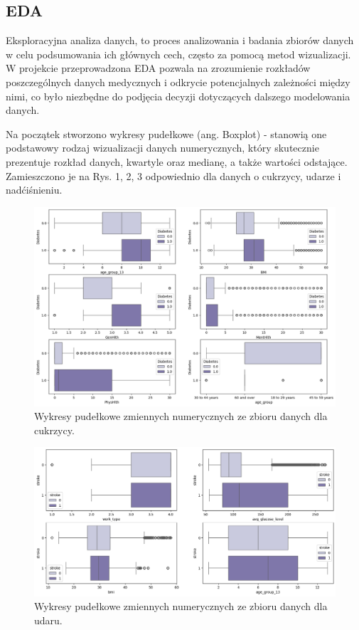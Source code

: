 \documentclass[onecolumn,12pt]{article}
\begin{document}
\subsection{EDA}
\noindent
Eksploracyjna analiza danych, to proces analizowania i badania zbiorów danych w celu podsumowania ich głównych cech, często za pomocą metod wizualizacji. W projekcie przeprowadzona EDA pozwala na zrozumienie rozkładów poszczególnych danych medycznych i odkrycie potencjalnych zależności między nimi, co było niezbędne do podjęcia decyzji dotyczących dalszego modelowania danych.

\vspace{8pt}
\noindent
Na początek stworzono wykresy pudełkowe (ang. Boxplot) - stanowią one podstawowy rodzaj wizualizacji danych numerycznych, który skutecznie prezentuje rozkład danych, kwartyle oraz medianę, a także wartości odstające. Zamieszczono je na Rys. 1, 2, 3 odpowiednio dla danych o cukrzycy, udarze i nadćiśnieniu. 

\begin{figure}[H]
    \centering
    \includegraphics[width=1\linewidth]{raport/graphs/diabetes_boxplots.png}
    \captionsetup{justification=centering}
    \caption{Wykresy pudełkowe zmiennych numerycznych ze zbioru danych dla cukrzycy.}
    \label{fig:enter-label}
\end{figure}

\begin{figure}[H]
    \centering
    \includegraphics[width=1\linewidth]{raport/graphs/stroke_boxplots.png}
    \captionsetup{justification=centering}
    \caption{Wykresy pudełkowe zmiennych numerycznych ze zbioru danych dla udaru.}
    \label{fig:enter-label}
\end{figure}
\end{document}
